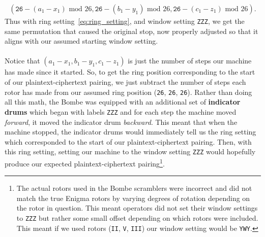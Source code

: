 \begin{align}
    \label{eq:ring_setting}
  (\texttt{26} - (a_1-x_1)\text{ mod }26, \texttt{26} -
  (b_1-y_1)\text{ mod }26, \texttt{26} - (c_1-z_1)\text{ mod }26).
\end{align}
Thus with ring setting~\ref{eq:ring_setting}, and window setting \texttt{ZZZ}, we get the same permutation that caused the original stop, now properly adjusted so that it aligns with our assumed starting window setting.
\\\\Notice that $(a_1-x_1, b_1-y_1, c_1-z_1)$ is just the number of steps
our machine has made since it started. So, to get the ring position
corresponding to the start of our plaintext-ciphertext pairing, we
just subtract the number of steps each rotor has made from our
assumed ring position (\texttt{26}, \texttt{26}, \texttt{26}). Rather
than doing all this math, the Bombe was equipped with an additional
set of {\bf{indicator drums}} which began with labels \texttt{ZZZ}
and for each step the machine moved \emph{forward}, it moved the
indicator drum \emph{backward}. This meant that when the machine
stopped, the indicator drums would immediately tell us the ring
setting which corresponded to the start of our plaintext-ciphertext pairing. Then,
with this ring setting, setting our machine to the window setting
\texttt{ZZZ} would hopefully produce our expected plaintext-ciphertext
pairing\footnote{The actual rotors used in the Bombe scramblers were
  incorrect and did not match the true Enigma rotors by varying degrees
  of rotation depending on the rotor in question. This meant operators
  did not set their window settings to \texttt{ZZZ} but rather some
  small offset depending on which rotors were included. This meant if
  we used rotors (\texttt{II}, \texttt{V}, \texttt{III}) our window
setting would be \texttt{YWY}.}.


